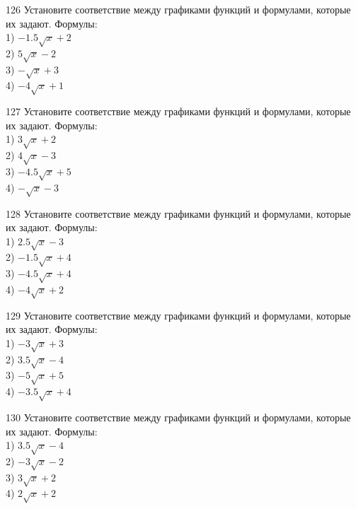 \documentclass[4apaper]{article}
\begin{document}
\begin{taskBN}{126}
Установите соответствие между графиками функций и формулами, которые их задают. Формулы: \\1) $-1.5\sqrt{x}+2$\\2) $5\sqrt{x}-2$\\3) $-\sqrt{x}+3$\\4) $-4\sqrt{x}+1$
\end{taskBN}

\begin{taskBN}{127}
Установите соответствие между графиками функций и формулами, которые их задают. Формулы: \\1) $3\sqrt{x}+2$\\2) $4\sqrt{x}-3$\\3) $-4.5\sqrt{x}+5$\\4) $-\sqrt{x}-3$
\end{taskBN}

\begin{taskBN}{128}
Установите соответствие между графиками функций и формулами, которые их задают. Формулы: \\1) $2.5\sqrt{x}-3$\\2) $-1.5\sqrt{x}+4$\\3) $-4.5\sqrt{x}+4$\\4) $-4\sqrt{x}+2$
\end{taskBN}

\begin{taskBN}{129}
Установите соответствие между графиками функций и формулами, которые их задают. Формулы: \\1) $-3\sqrt{x}+3$\\2) $3.5\sqrt{x}-4$\\3) $-5\sqrt{x}+5$\\4) $-3.5\sqrt{x}+4$
\end{taskBN}

\begin{taskBN}{130}
Установите соответствие между графиками функций и формулами, которые их задают. Формулы: \\1) $3.5\sqrt{x}-4$\\2) $-3\sqrt{x}-2$\\3) $3\sqrt{x}+2$\\4) $2\sqrt{x}+2$
\end{taskBN}
\end{document}
